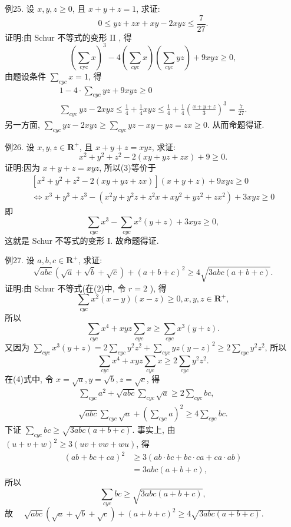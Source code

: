 例25. 设 $x, y, z \geqslant 0$, 且 $x+y+z=1$, 求证:
$$
0 \leqslant y z+z x+x y-2 x y z \leqslant \frac{7}{27} .
$$
证明:由 Schur 不等式的变形 II , 得
$$
\left(\sum_{\mathrm{cyc}} x\right)^3-4\left(\sum_{c y c} x\right)\left(\sum_{c y c} y z\right)+9 x y z \geqslant 0,
$$
由题设条件 $\sum_{c y c} x=1$, 得
$$
\begin{gathered}
1-4 \cdot \sum_{c y c} y z+9 x y z \geqslant 0 \\
\sum_{c y c} y z-2 x y z \leqslant \frac{1}{4}+\frac{1}{4} x y z \leqslant \frac{1}{4}+\frac{1}{4}\left(\frac{x+y+z}{3}\right)^3=\frac{7}{27} .
\end{gathered}
$$
另一方面, $\sum_{c y c} y z-2 x y z \geqslant \sum_{c y c} y z-x y-y z=z x \geqslant 0$.
从而命题得证.



例26. 设 $x, y, z \in \mathbf{R}^{+}$, 且 $x+y+z=x y z$, 求证:
$$
x^2+y^2+z^2-2(x y+y z+z x)+9 \geqslant 0 . \label{(3)}
$$
证明:因为 $x+y+z=x y z$, 所以(3)等价于
$$
\begin{gathered}
{\left[x^2+y^2+z^2-2(x y+y z+z x)\right](x+y+z)+9 x y z \geqslant 0} \\
\Leftrightarrow x^3+y^3+z^3-\left(x^2 y+y^2 z+z^2 x+x y^2+y z^2+z x^2\right)+3 x y z \geqslant 0
\end{gathered}
$$
即
$$
\sum_{c y c} x^3-\sum_{c y c} x^2(y+z)+3 x y z \geqslant 0,
$$
这就是 Schur 不等式的变形 I. 故命题得证.



例27. 设 $a, b, c \in \mathbf{R}^{+}$, 求证:
$$
\sqrt{a b c}(\sqrt{a}+\sqrt{b}+\sqrt{c})+(a+b+c)^2 \geqslant 4 \sqrt{3 a b c(a+b+c)} .
$$
证明:由 Schur 不等式(在(2)中, 令 $r=2$ ), 得
$$
\sum_{c y c} x^2(x-y)(x-z) \geqslant 0, x, y, z \in \mathbf{R}^{+},
$$
所以
$$
\sum_{c y c} x^4+x y z \sum_{c y c} x \geqslant \sum_{c y c} x^3(y+z) . \label{(4)}
$$
又因为 $\sum_{c y c} x^3(y+z)=2 \sum_{c y c} y^2 z^2+\sum_{c y c} y z(y-z)^2 \geqslant 2 \sum_{c y c} y^2 z^2$, 所以
$$
\sum_{c y c} x^4+x y z \sum_{c y c} x \geqslant 2 \sum_{c y c} y^2 z^2 .
$$
在(4)式中, 令 $x=\sqrt{a}, y=\sqrt{b}, z=\sqrt{c}$, 得
$$
\begin{gathered}
\sum_{c y c} a^2+\sqrt{a b c} \sum_{c y c} \sqrt{a} \geqslant 2 \sum_{c y c} b c, \\
\sqrt{a b c} \sum_{c y c} \sqrt{a}+\left(\sum_{c y c} a\right)^2 \geqslant 4 \sum_{c y c} b c .
\end{gathered}
$$
下证 $\sum_{c y c} b c \geqslant \sqrt{3 a b c(a+b+c)}$.
事实上, 由 $(u+v+w)^2 \geqslant 3(u v+v w+w u)$, 得
$$
\begin{aligned}
(a b+b c+c a)^2 & \geqslant 3(a b \cdot b c+b c \cdot c a+c a \cdot a b) \\
& =3 a b c(a+b+c),
\end{aligned}
$$
所以
$$
\sum_{c y c} b c \geqslant \sqrt{3 a b c(a+b+c)},
$$
故 $\quad \sqrt{a b c}(\sqrt{a}+\sqrt{b}+\sqrt{c})+(a+b+c)^2 \geqslant 4 \sqrt{3 a b c(a+b+c)}$.



